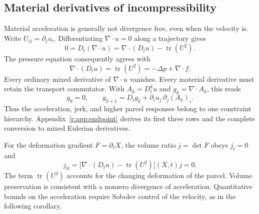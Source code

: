 


\subsection{Material derivatives of incompressibility}

Material acceleration is generally not divergence free, even when
the velocity is. Write \(U_{ij}=\partial_j u_i\).
Differentiating \(\nabla\cdot u=0\) along a trajectory gives
\[
 0=D_t(\nabla\cdot u)
   =\nabla\cdot(D_tu)-\operatorname{tr}(U^2).
\]
The pressure equation consequently agrees with
\[
 \nabla\cdot(D_tu)=\operatorname{tr}(U^2)
 =-\Delta p+\nabla\cdot f.
\]
Every ordinary mixed derivative of \(\nabla\cdot u\) vanishes. Every
material derivative must retain the transport commutator. With
\(A_k=D_t^ku\) and \(g_k=\nabla\cdot A_k\), this reads
\[
 g_0=0,\qquad
 g_{k+1}=D_tg_k+\partial_i u_j\,\partial_j(A_k)_i.
\]
Thus the acceleration, jerk, and higher parcel responses belong to one
constraint hierarchy. Appendix~\ref{r:app:endpoint} derives its first
three rows and the complete conversion to mixed Eulerian derivatives.

For the deformation gradient \(F=\partial_\ell X\), the volume ratio
\(j=\det F\) obeys \(j_t=0\) and
\[
 j_{tt}=\bigl[\nabla\cdot(D_tu)-\operatorname{tr}(U^2)\bigr](X,t)j=0.
\]
The term \(\operatorname{tr}(U^2)\) accounts for the changing
deformation of the parcel. Volume preservation is consistent with a
nonzero divergence of acceleration. Quantitative bounds on the
acceleration require Sobolev control of the velocity, as in the
following corollary.

